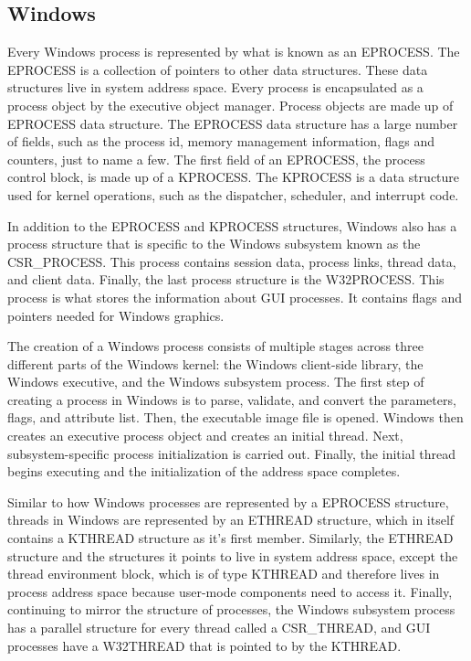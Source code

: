 \documentclass[journal,letterpaper,draftclsnofoot,onecolumn,10pt]{IEEEtran}
\begin{document}
\subsection{Windows}

Every Windows process is represented by what is known as an EPROCESS. The EPROCESS is a collection of pointers to other data structures. These data structures live in system address space. Every process is encapsulated as a process object by the executive object manager. Process objects are made up of EPROCESS data structure. The EPROCESS data structure has a large number of fields, such as the process id, memory management information, flags and counters, just to name a few. The first field of an EPROCESS, the process control block, is made up of a KPROCESS. The KPROCESS is a data structure used for kernel operations, such as the dispatcher, scheduler, and interrupt code.\cite{1ris12}

In addition to the EPROCESS and KPROCESS structures, Windows also has a process structure that is specific to the Windows subsystem known as the CSR\_PROCESS. This process contains session data, process links, thread data, and client data. Finally, the last process structure is the W32PROCESS. This process is what stores the information about GUI processes. It contains flags and pointers needed for Windows graphics.\cite{1ris12}

The creation of a Windows process consists of multiple stages across three different parts of the Windows kernel: the Windows client-side library, the Windows executive, and the Windows subsystem process. The first step of creating a process in Windows is to parse, validate, and convert the parameters, flags, and attribute list. Then, the executable image file is opened. Windows then creates an executive process object and creates an initial thread. Next, subsystem-specific process initialization is carried out. Finally, the initial thread begins executing and the initialization of the address space completes.\cite{1ris12}

Similar to how Windows processes are represented by a EPROCESS structure, threads in Windows are represented by an ETHREAD structure, which in itself contains a KTHREAD structure as it's first member. Similarly, the ETHREAD structure and the structures it points to live in system address space, except the thread environment block, which is of type KTHREAD and therefore lives in process address space because user-mode components need to access it. Finally, continuing to mirror the structure of processes, the Windows subsystem process has a parallel structure for every thread called a CSR\_THREAD, and GUI processes have a W32THREAD that is pointed to by the KTHREAD.\cite{1ris12}
\end{document}

